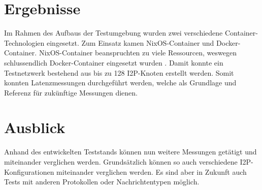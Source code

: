\documentclass[
	a4paper,10pt
]{scrartcl}
\begin{document}
\section{Ergebnisse}

Im Rahmen des Aufbaus der Testumgebung wurden zwei verschiedene Container-Technologien eingesetzt. Zum Einsatz kamen NixOS-Container und Docker-Container.
NixOS-Container beanspruchten zu viele Ressourcen, weswegen schlussendlich Docker-Container eingesetzt wurden .
Damit konnte ein Testnetzwerk bestehend aus bis zu 128 I2P-Knoten erstellt werden.
Somit konnten Latenzmessungen durchgeführt werden,
welche als Grundlage und Referenz für zukünftige Messungen dienen.

\section{Ausblick}

Anhand des entwickelten Teststands können nun weitere Messungen getätigt und miteinander verglichen werden.
Grundsätzlich können so auch verschiedene I2P-Konfigurationen miteinander verglichen werden.
Es sind aber in Zukunft auch Tests mit anderen Protokollen oder Nachrichtentypen möglich.
\end{document}
